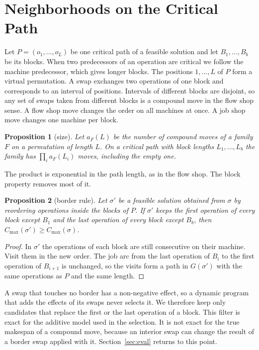 \documentclass[10pt,twocolumn]{article}
\newtheorem{proposition}{Proposition}
\newcommand{\Cmax}{C_{\max}}
\begin{document}
\section{Neighborhoods on the Critical Path}\label{sec:family}

Let $P=(o_1,\dots,o_L)$ be one critical path of a feasible solution and
let $B_1,\dots,B_b$ be its blocks. When two predecessors of an operation
are critical we follow the machine predecessor, which gives longer blocks.
The positions $1,\dots,L$ of $P$ form a virtual permutation. A swap
exchanges two operations of one block and corresponds to an interval of
positions. Intervals of different blocks are disjoint, so any set of swaps
taken from different blocks is a compound move in the flow shop sense. A
flow shop move changes the order on all machines at once. A job shop move
changes one machine per block.

\begin{proposition}[size]\label{pr:count}
Let $a_F(L)$ be the number of compound moves of a family $F$ on a
permutation of length $L$. On a critical path with block lengths
$L_1,\dots,L_b$ the family has $\prod_{i} a_F(L_i)$ moves, including the
empty one.
\end{proposition}

The product is exponential in the path length, as in the flow shop. The
block property removes most of it.

\begin{proposition}[border rule]\label{pr:border}
Let $\sigma'$ be a feasible solution obtained from $\sigma$ by reordering
operations inside the blocks of $P$. If $\sigma'$ keeps the first
operation of every block except $B_1$ and the last operation of every
block except $B_b$, then $\Cmax(\sigma')\ge\Cmax(\sigma)$.
\end{proposition}
\begin{proof}
In $\sigma'$ the operations of each block are still consecutive on their
machine. Visit them in the new order. The job arc from the last operation
of $B_i$ to the first operation of $B_{i+1}$ is unchanged, so the visits
form a path in $G(\sigma')$ with the same operations as $P$ and the same
length.
\end{proof}

A swap that touches no border has a non-negative effect, so a dynamic
program that adds the effects of its swaps never selects it. We therefore
keep only candidates that replace the first or the last operation of a
block. This filter is exact for the additive model used in the selection.
It is not exact for the true makespan of a compound move, because an
interior swap can change the result of a border swap applied with it.
Section~\ref{sec:eval} returns to this point.
\end{document}
